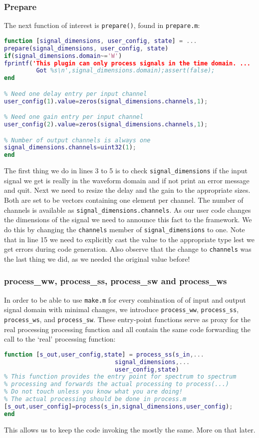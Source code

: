 \documentclass[11pt,a4paper,twoside]{article}
\newcommand{\+}{\discretionary{\mbox{\scriptsize$\hookleftarrow$}}{}{}}
\begin{document}
\subsubsection*{Prepare}
The next function of interest is \texttt{prepare()}, found in \texttt{prepare.m}:
\begin{lstlisting}[language=Matlab]
function [signal_dimensions, user_config, state] = ...
prepare(signal_dimensions, user_config, state)
if(signal_dimensions.domain~='W')
fprintf('This plugin can only process signals in the time domain. ...
         Got %s\n',signal_dimensions.domain);assert(false);
end

% Need one delay entry per input channel
user_config(1).value=zeros(signal_dimensions.channels,1);

% Need one gain entry per input channel
user_config(2).value=zeros(signal_dimensions.channels,1);

% Number of output channels is always one
signal_dimensions.channels=uint32(1);
end
\end{lstlisting}
The first thing we do in lines 3 to 5 is to check \texttt{signal\_dimensions} if the
input signal we get is really in the waveform domain and if not print an error
message and quit.
Next we need to resize the delay and the gain to the appropriate sizes. Both are
set to be vectors containing one element per channel. The number of channels is
available as \texttt{signal\_dimensions.channels}. As our user code changes the
dimensions of the signal we need to announce this fact to the \mha{} framework.
We do this by changing the \texttt{channels} member of \texttt{signal\_dimensions} to one.
Note that in line 15 we need to explicitly cast the value to the appropriate type lest we
get errors during code generation. Also observe that the change to \texttt{channels}
was the last thing we did, as we needed the original value before!
\subsubsection*{process\_ww, process\_ss, process\_sw and process\_ws}
In order to be able to use \texttt{make.m} for every combination of of input and
output signal domain with minimal changes, we introduce \texttt{process\_ww},
\texttt{process\_ss}, \texttt{process\_ws}, and \texttt{process\_sw}. These entry-point functions serve
as proxy for the real processing processing function and all contain the same
code forwarding the call to the `real' processing function:
\begin{lstlisting}[language=Matlab]
function [s_out,user_config,state] = process_ss(s_in,...
                               signal_dimensions,...
                               user_config,state)
% This function provides the entry point for spectrum to spectrum
% processing and forwards the actual processing to process(...)
% Do not touch unless you know what you are doing! 
% The actual processing should be done in process.m
[s_out,user_config]=process(s_in,signal_dimensions,user_config);
end
\end{lstlisting}
This allows us to keep the code invoking the \Matlab{} mostly the same. More on
that later. 
\end{document}
